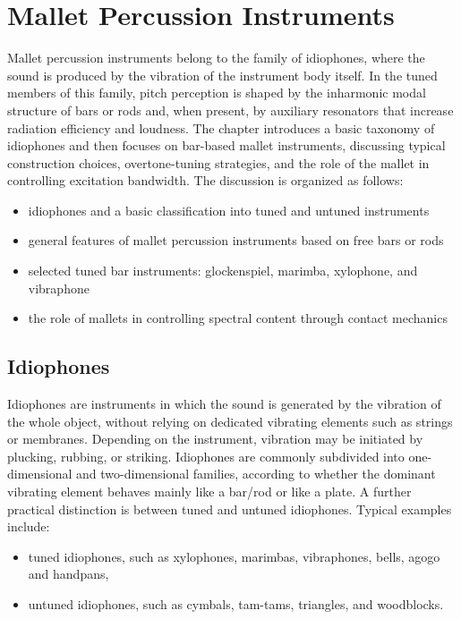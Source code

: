 
\chapter{Mallet Percussion Instruments}

Mallet percussion instruments belong to the family of idiophones, where the sound is produced by the vibration of the instrument body itself. In the tuned members of this family, pitch perception is shaped by the inharmonic modal structure of bars or rods and, when present, by auxiliary resonators that increase radiation efficiency and loudness. The chapter introduces a basic taxonomy of idiophones and then focuses on bar-based mallet instruments, discussing typical construction choices, overtone-tuning strategies, and the role of the mallet in controlling excitation bandwidth. The discussion is organized as follows:

\begin{itemize}
  \item idiophones and a basic classification into tuned and untuned instruments
  \item general features of mallet percussion instruments based on free bars or rods
  \item selected tuned bar instruments: glockenspiel, marimba, xylophone, and vibraphone
  \item the role of mallets in controlling spectral content through contact mechanics
\end{itemize}

\section{Idiophones}

Idiophones are instruments in which the sound is generated by the vibration of the whole object, without relying on dedicated vibrating elements such as strings or membranes. Depending on the instrument, vibration may be initiated by plucking, rubbing, or striking. Idiophones are commonly subdivided into one-dimensional and two-dimensional families, according to whether the dominant vibrating element behaves mainly like a bar/rod or like a plate. A further practical distinction is between tuned and untuned idiophones. Typical examples include:

\begin{itemize}
  \item tuned idiophones, such as xylophones, marimbas, vibraphones, bells, agogo and handpans,
  \item untuned idiophones, such as cymbals, tam-tams, triangles, and woodblocks.
\end{itemize}


